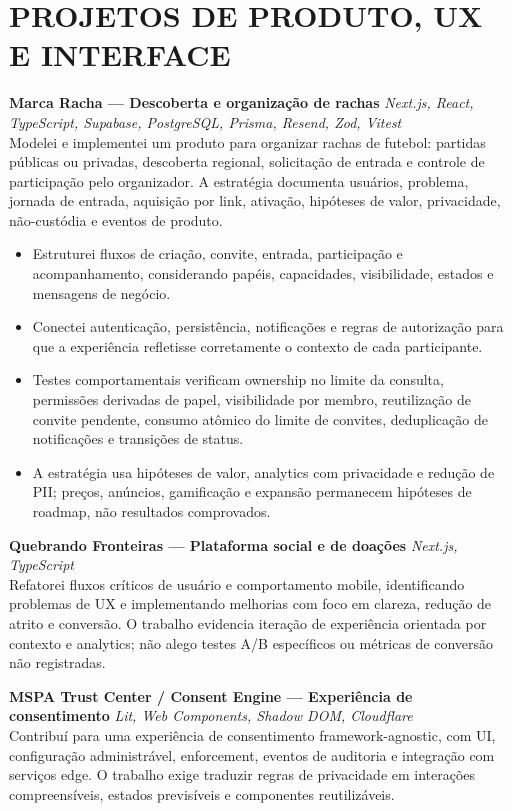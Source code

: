 \documentclass[10pt,a4paper]{article}
\begin{document}
\section*{PROJETOS DE PRODUTO, UX E INTERFACE}
\textbf{Marca Racha — Descoberta e organização de rachas} \hfill \textit{Next.js, React, TypeScript, Supabase, PostgreSQL, Prisma, Resend, Zod, Vitest}\\
Modelei e implementei um produto para organizar rachas de futebol: partidas públicas ou privadas, descoberta regional, solicitação de entrada e controle de participação pelo organizador. A estratégia documenta usuários, problema, jornada de entrada, aquisição por link, ativação, hipóteses de valor, privacidade, não-custódia e eventos de produto.
\begin{itemize}
\item Estruturei fluxos de criação, convite, entrada, participação e acompanhamento, considerando papéis, capacidades, visibilidade, estados e mensagens de negócio.
\item Conectei autenticação, persistência, notificações e regras de autorização para que a experiência refletisse corretamente o contexto de cada participante.
\item Testes comportamentais verificam ownership no limite da consulta, permissões derivadas de papel, visibilidade por membro, reutilização de convite pendente, consumo atômico do limite de convites, deduplicação de notificações e transições de status.
\item A estratégia usa hipóteses de valor, analytics com privacidade e redução de PII; preços, anúncios, gamificação e expansão permanecem hipóteses de roadmap, não resultados comprovados.
\end{itemize}

\textbf{Quebrando Fronteiras — Plataforma social e de doações} \hfill \textit{Next.js, TypeScript}\\
Refatorei fluxos críticos de usuário e comportamento mobile, identificando problemas de UX e implementando melhorias com foco em clareza, redução de atrito e conversão. O trabalho evidencia iteração de experiência orientada por contexto e analytics; não alego testes A/B específicos ou métricas de conversão não registradas.

\textbf{MSPA Trust Center / Consent Engine — Experiência de consentimento} \hfill \textit{Lit, Web Components, Shadow DOM, Cloudflare}\\
Contribuí para uma experiência de consentimento framework-agnostic, com UI, configuração administrável, enforcement, eventos de auditoria e integração com serviços edge. O trabalho exige traduzir regras de privacidade em interações compreensíveis, estados previsíveis e componentes reutilizáveis.
\end{document}
